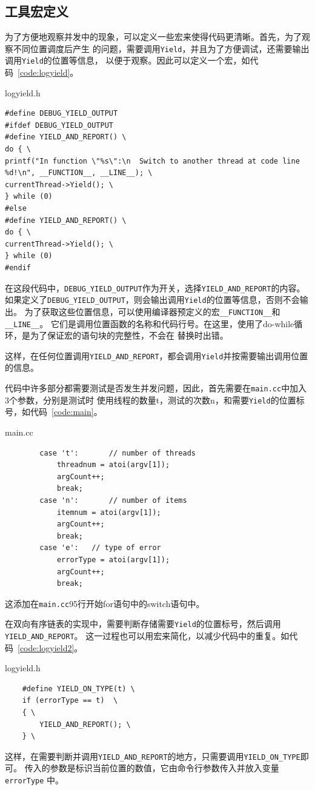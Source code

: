 \documentclass[a4paper,twoside]{article}
\begin{document}
\begin{spacing}{1.2}
\subsection{工具宏定义}

为了方便地观察并发中的现象，可以定义一些宏来使得代码更清晰。首先，为了观察不同位置调度后产生
的问题，需要调用\texttt{Yield}，并且为了方便调试，还需要输出调用\texttt{Yield}的位置等信息，
以便于观察。因此可以定义一个宏，如代码~\ref{code:logyield}。
\begin{listing}[htb]
	\caption{logyield.h}
	\label{code:logyield}
	\begin{verbatim}
#define DEBUG_YIELD_OUTPUT
#ifdef DEBUG_YIELD_OUTPUT
#define YIELD_AND_REPORT() \
do { \
printf("In function \"%s\":\n  Switch to another thread at code line %d!\n", __FUNCTION__, __LINE__); \
currentThread->Yield(); \
} while (0)
#else
#define YIELD_AND_REPORT() \
do { \
currentThread->Yield(); \
} while (0)
#endif
	\end{verbatim}
\end{listing}

在这段代码中，\texttt{DEBUG\_YIELD\_OUTPUT}作为开关，选择\texttt{YIELD\_AND\_REPORT}的内容。
如果定义了\texttt{DEBUG\_YIELD\_OUTPUT}，则会输出调用\texttt{Yield}的位置等信息，否则不会输出。
为了获取这些位置信息，可以使用编译器预定义的宏\texttt{\_\_FUNCTION\_\_}和
\texttt{\_\_LINE\_\_}。
它们是调用位置函数的名称和代码行号。在这里，使用了do-while循环，是为了保证宏的语句块的完整性，不会在
替换时出错。

这样，在任何位置调用\texttt{YIELD\_AND\_REPORT}，都会调用\texttt{Yield}并按需要输出调用位置的信息。

代码中许多部分都需要测试是否发生并发问题，因此，首先需要在\texttt{main.cc}中加入3个参数，分别是测试时
使用线程的数量t，测试的次数n，和需要\texttt{Yield}的位置标号，如代码~\ref{code:main}。
\begin{listing}[htb]
	\caption{main.cc}
	\label{code:main}
	\begin{verbatim}
		case 't':		// number of threads
			threadnum = atoi(argv[1]);
			argCount++;
			break;
		case 'n':		// number of items
			itemnum = atoi(argv[1]);
			argCount++;
			break;
		case 'e': 	// type of error
			errorType = atoi(argv[1]);
			argCount++;
			break;
	\end{verbatim}
\end{listing}
这添加在\texttt{main.cc}95行开始for语句中的switch语句中。

在双向有序链表的实现中，需要判断存储需要\texttt{Yield}的位置标号，然后调用\texttt{YIELD\_AND\_REPORT}。
这一过程也可以用宏来简化，以减少代码中的重复。如代码~\ref{code:logyield2}。
\begin{listing}[htb]
	\caption{logyield.h}
	\label{code:logyield2}
	\begin{verbatim}
	#define YIELD_ON_TYPE(t) \
	if (errorType == t)	 \
	{ \
		YIELD_AND_REPORT(); \
	} \
	\end{verbatim}
\end{listing}
这样，在需要判断并调用\texttt{YIELD\_AND\_REPORT}的地方，只需要调用\texttt{YIELD\_ON\_TYPE}即可。
传入的参数是标识当前位置的数值，它由命令行参数传入并放入变量\texttt{errorType}
中。


\end{spacing}
\end{document}
